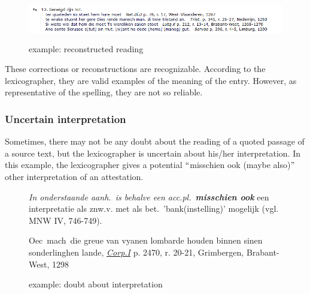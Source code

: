 \documentclass[10pt]{article}
\begin{document}
\begin{figure}[H]
	\begin{Center}
		\includegraphics[width=6.27in,height=0.72in]{./image15.png}
	\end{Center}
	\caption{example: reconstructed reading}
\end{figure}


These corrections or reconstructions are recognizable. According to the lexicographer, they are valid examples of the meaning of the entry. However, as representative of the spelling, they are not so reliable.\par



\subsubsection*{Uncertain interpretation}



Sometimes, there may not be any doubt about the reading of a quoted passage of a source text, but the lexicographer is uncertain about his/her interpretation. In this example, the lexicographer gives a potential $``$misschien ook (maybe also)$"$  other interpretation of an attestation.

\bigskip

\begin{figure}[H]
\begin{minipage}{14cm}
{
\small
\textit{In onderstaande aanh.~is behalve een acc.pl.~}\textbf{\textit{misschien ook}}  een interpretatie als znw.v. met als bet.~'bank(instelling)' mogelijk (vgl. MNW IV, 746-749).


 Oec\ mach\ die greue van vyanen lombarde houden binnen sinen sonderlinghen lande,   \href{http://gtb.ivdnt.org/iWDB/search?actie=article&wdb=VMNWBRONNEN&id=1646}{\textit{\uline{Corp.I}}} p. 2470, r. 20-21, Grimbergen, Brabant-West, 1298
}
\end{minipage}
\caption{example: doubt about interpretation}
\end{figure}
\end{document}
